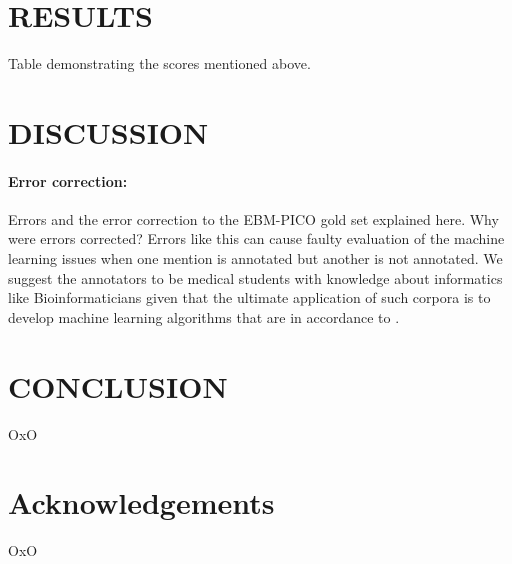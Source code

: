 \documentclass[10.7pt,]{article}
\let\oldparagraph\paragraph
\renewcommand{\paragraph}[1]{\oldparagraph{#1}\mbox{}}
\begin{document}
\section{RESULTS}\label{results}
%
Table demonstrating the scores mentioned above.
%
%
%
\section{DISCUSSION}\label{discussion}
%
\paragraph{Error correction: } Errors and the error correction to the EBM-PICO gold set explained here. 
Why were errors corrected?
Errors like this can cause faulty evaluation of the machine learning issues when one mention is annotated but another is not annotated.
We suggest the annotators to be medical students with knowledge about informatics like Bioinformaticians given that the ultimate application of such corpora is to develop machine learning algorithms that are in accordance to .
%
%
%
\section{CONCLUSION}\label{conclusion}
%
OxO
%
%
%
\section{Acknowledgements}\label{acknowledgements}
%
OxO
%
%
%


\end{document}
